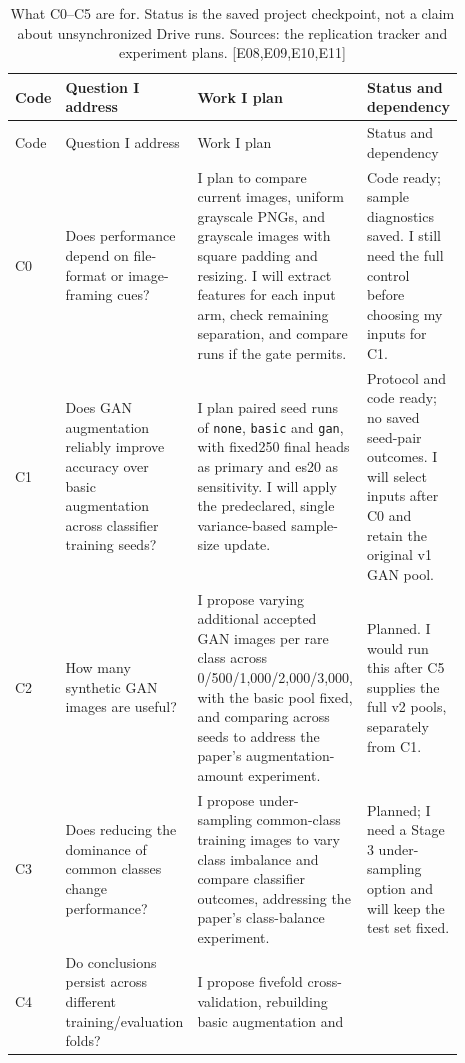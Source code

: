 \documentclass[11pt,a4paper]{article}
\newcommand{\ev}[1]{\textcolor{Link}{\textsf{[#1]}}}
\begin{document}
\begin{longtable}{>{\raggedright\arraybackslash}p{0.06\linewidth}
                  >{\raggedright\arraybackslash}p{0.28\linewidth}
                  >{\raggedright\arraybackslash}p{0.33\linewidth}
                  >{\raggedright\arraybackslash}p{0.22\linewidth}}
\caption{What C0--C5 are for. Status is the saved project checkpoint, not
a claim about unsynchronized Drive runs. Sources: the replication tracker
and experiment plans. \ev{E08,E09,E10,E11}}
\label{tab:work-packages}\\
\toprule
Code & Question I address & Work I plan & Status and dependency\\
\midrule
\endfirsthead
\toprule
Code & Question I address & Work I plan & Status and dependency\\
\midrule
\endhead
\bottomrule\endfoot
C0 &
Does performance depend on file-format or image-framing cues? &
I plan to compare current images, uniform grayscale PNGs, and grayscale
images with square padding and resizing. I will extract features for each
input arm, check remaining separation, and compare runs if the gate permits. &
Code ready; sample diagnostics saved. I still need the full control before
choosing my inputs for C1.\\
C1 &
Does GAN augmentation reliably improve accuracy over basic augmentation
across classifier training seeds? &
I plan paired seed runs of \texttt{none}, \texttt{basic} and \texttt{gan},
with fixed250 final heads as primary and es20 as sensitivity. I will apply
the predeclared, single variance-based sample-size update. &
Protocol and code ready; no saved seed-pair outcomes. I will select inputs
after C0 and retain the original v1 GAN pool.\\
C2 &
How many synthetic GAN images are useful? &
I propose varying additional accepted GAN images per rare class across
0/500/1,000/2,000/3,000, with the basic pool fixed, and comparing across
seeds to address the paper's augmentation-amount experiment. &
Planned. I would run this after C5 supplies the full v2 pools, separately
from C1.\\
C3 &
Does reducing the dominance of common classes change performance? &
I propose under-sampling common-class training images to vary class imbalance
and compare classifier outcomes, addressing the paper's class-balance
experiment. &
Planned; I need a Stage 3 under-sampling option and will keep the test set fixed.\\
C4 &
Do conclusions persist across different training/evaluation folds? &
I propose fivefold cross-validation, rebuilding basic augmentation and

\end{longtable}
\end{document}
